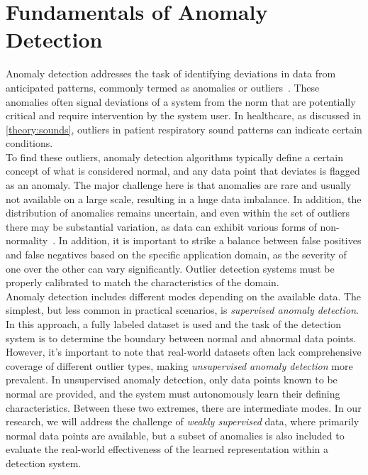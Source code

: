 \section{Fundamentals of Anomaly Detection}
Anomaly detection addresses the task of identifying deviations in data from anticipated patterns, commonly termed as anomalies or outliers~\cite{chandola2009anomaly}. These anomalies often signal deviations of a system from the norm that are potentially critical and require intervention by the system user. In healthcare, as discussed in \autoref{theory:sounds}, outliers in patient respiratory sound patterns can indicate certain conditions. \\
To find these outliers, anomaly detection algorithms typically define a certain concept of what is considered normal, and any data point that deviates is flagged as an anomaly. The major challenge here is that anomalies are rare and usually not available on a large scale, resulting in a huge data imbalance. In addition, the distribution of anomalies remains uncertain, and even within the set of outliers there may be substantial variation, as data can exhibit various forms of non-normality~\cite{pang2021deep}. In addition, it is important to strike a balance between false positives and false negatives based on the specific application domain, as the severity of one over the other can vary significantly. Outlier detection systems must be properly calibrated to match the characteristics of the domain.\\
Anomaly detection includes different modes depending on the available data. The simplest, but less common in practical scenarios, is \textit{supervised anomaly detection}. In this approach, a fully labeled dataset is used and the task of the detection system is to determine the boundary between normal and abnormal data points. However, it's important to note that real-world datasets often lack comprehensive coverage of different outlier types, making \textit{unsupervised anomaly detection} more prevalent. In unsupervised anomaly detection, only data points known to be normal are provided, and the system must autonomously learn their defining characteristics. Between these two extremes, there are intermediate modes. In our research, we will address the challenge of \textit{weakly supervised} data, where primarily normal data points are available, but a subset of anomalies is also included to evaluate the real-world effectiveness of the learned representation within a detection system. \\
